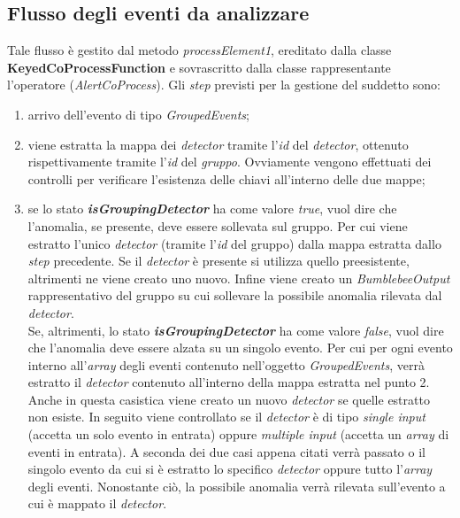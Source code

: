 \subsection{Flusso degli eventi da analizzare}\label{sec:pr1-alertcoprocess}
Tale flusso è gestito dal metodo \textit{processElement1}, ereditato dalla classe \textbf{KeyedCoProcessFunction} e sovrascritto dalla classe rappresentante l'operatore (\textit{AlertCoProcess}). Gli \textit{step} previsti per la gestione del suddetto sono:
\begin{enumerate}
	\item{arrivo dell'evento di tipo \textit{GroupedEvents};}
	\item{viene estratta la mappa dei \textit{detector} tramite l'\textit{id} del \textit{detector}, ottenuto rispettivamente tramite l'\textit{id} del \textit{gruppo}. Ovviamente vengono effettuati dei controlli per verificare l'esistenza delle chiavi all'interno delle due mappe;}
	\item{se lo stato \textbf{\textit{isGroupingDetector}} ha come valore \textit{true}, vuol dire che l'anomalia, se presente, deve essere sollevata sul gruppo. Per cui viene estratto l'unico \textit{detector} (tramite l'\textit{id} del gruppo) dalla mappa estratta dallo \textit{step} precedente. Se il \textit{detector} è presente si utilizza quello preesistente, altrimenti ne viene creato uno nuovo. Infine viene creato un \textit{BumblebeeOutput} rappresentativo del gruppo su cui sollevare la possibile anomalia rilevata dal \textit{detector}.\\
	Se, altrimenti, lo stato \textbf{\textit{isGroupingDetector}} ha come valore \textit{false}, vuol dire che l'anomalia deve essere alzata su un singolo evento. Per cui per ogni evento interno all'\textit{array} degli eventi contenuto nell'oggetto \textit{GroupedEvents}, verrà estratto il \textit{detector} contenuto all'interno della mappa estratta nel punto 2. Anche in questa casistica viene creato un nuovo \textit{detector} se quelle estratto non esiste. In seguito viene controllato se il \textit{detector} è di tipo \textit{single input} (accetta un solo evento in entrata) oppure \textit{multiple input} (accetta un \textit{array} di eventi in entrata). A seconda dei due casi appena citati verrà passato o il singolo evento da cui si è estratto lo specifico \textit{detector} oppure tutto l'\textit{array} degli eventi. Nonostante ciò, la possibile anomalia verrà rilevata sull'evento a cui è mappato il \textit{detector}.}
\end{enumerate}

